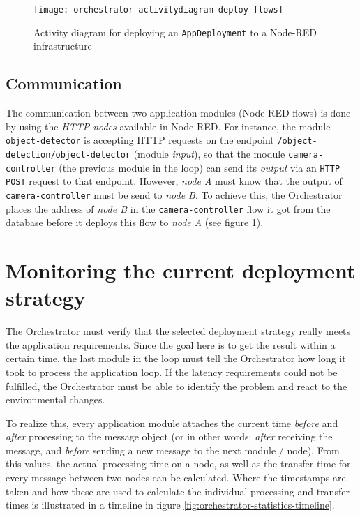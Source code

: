 \begin{figure}[htb]
    \centering
    \texttt{[image: orchestrator-activitydiagram-deploy-flows]}
    \caption{Activity diagram for deploying an \texttt{AppDeployment} to a Node-RED infrastructure}
    \label{fig:orchestrator-activitydiagram-deploy-flows}
\end{figure}

\subsection*{Communication}
The communication between two application modules (Node-RED flows) is done by using the \textit{HTTP nodes} available in Node-RED. For instance, the module \texttt{object-detector} is accepting HTTP requests on the endpoint \texttt{/object-detection/object-detector} (module \textit{input}), so that the module \texttt{camera-controller} (the previous module in the loop) can send its \textit{output} via an \texttt{HTTP POST} request to that endpoint. However, \textit{node A} must know that the output of \texttt{camera-controller} must be send to \textit{node B}. To achieve this, the Orchestrator places the address of \textit{node B} in the \texttt{camera-controller} flow it got from the database before it deploys this flow to \textit{node A} (see figure \ref{fig:orchestrator-activitydiagram-deploy-flows}).

\section{Monitoring the current deployment strategy}

The Orchestrator must verify that the selected deployment strategy really meets the application requirements. Since the goal here is to get the result within a certain time, the last module in the loop must tell the Orchestrator how long it took to process the application loop. If the latency requirements could not be fulfilled, the Orchestrator must be able to identify the problem and react to the environmental changes.

To realize this, every application module attaches the current time \textit{before} and \textit{after} processing to the message object (or in other words: \textit{after} receiving the message, and \textit{before} sending a new message to the next module / node). From this values, the actual processing time on a node, as well as the transfer time for every message between two nodes can be calculated. Where the timestamps are taken and how these are used to calculate the individual processing and transfer times is illustrated in a timeline in figure \ref{fig:orchestrator-statistics-timeline}.

